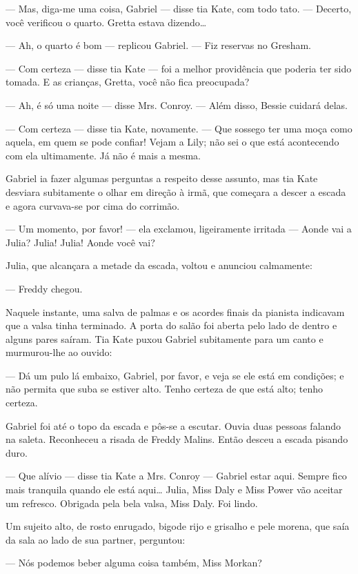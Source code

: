 --- Mas, diga-me uma coisa, Gabriel --- disse tia Kate, com todo tato.
--- Decerto, você verificou o quarto. Gretta estava dizendo\ldots{}

--- Ah, o quarto é bom --- replicou Gabriel. --- Fiz reservas no
Gresham.

--- Com certeza --- disse tia Kate --- foi a melhor providência que
poderia ter sido tomada. E as crianças, Gretta, você não fica
preocupada?

--- Ah, é só uma noite --- disse Mrs. Conroy. --- Além disso, Bessie
cuidará delas.

--- Com certeza --- disse tia Kate, novamente. --- Que sossego ter uma
moça como aquela, em quem se pode confiar! Vejam a Lily; não sei o que
está acontecendo com ela ultimamente. Já não é mais a mesma.

Gabriel ia fazer algumas perguntas a respeito desse assunto, mas tia
Kate desviara subitamente o olhar em direção à irmã, que começara a
descer a escada e agora curvava-se por cima do corrimão.

--- Um momento, por favor! --- ela exclamou, ligeiramente irritada ---
Aonde vai a Julia? Julia! Julia! Aonde você vai?

Julia, que alcançara a metade da escada, voltou e anunciou calmamente:

--- Freddy chegou.

Naquele instante, uma salva de palmas e os acordes finais da pianista
indicavam que a valsa tinha terminado. A porta do salão foi aberta
pelo lado de dentro e alguns pares saíram. Tia Kate puxou Gabriel
subitamente para um canto e murmurou-lhe ao ouvido:

--- Dá um pulo lá embaixo, Gabriel, por favor, e veja se ele está em
condições; e não permita que suba se estiver alto. Tenho certeza de
que está alto; tenho certeza.

Gabriel foi até o topo da escada e pôs-se a escutar. Ouvia duas
pessoas falando na saleta. Reconheceu a risada de Freddy Malins. Então
desceu a escada pisando duro.

--- Que alívio --- disse tia Kate a Mrs. Conroy --- Gabriel estar
aqui. Sempre fico mais tranquila quando ele está aqui\ldots{} Julia, Miss
Daly e Miss Power vão aceitar um refresco. Obrigada pela bela valsa,
Miss Daly. Foi lindo.

Um sujeito alto, de rosto enrugado, bigode rijo e grisalho e pele
morena, que saía da sala ao lado de sua partner, perguntou:

--- Nós podemos beber alguma coisa também, Miss Morkan?

